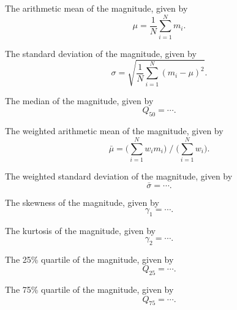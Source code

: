\begin{enumerate}

 The arithmetic mean of the magnitude, given by
\begin{equation}\mu = \frac{1}{N} \sum\limits_{i=1}^{N} m_i.\end{equation}

 The standard deviation of the magnitude, given by
\begin{equation}\sigma = \sqrt{\frac{1}{N} \sum_{i=1}^N (m_i - \mu)^2}.\end{equation}

 The median of the magnitude, given by
\begin{equation}Q_{50} = \cdots.\end{equation}

 The weighted arithmetic mean of the magnitude, given by
\begin{equation}\bar \mu = \big(\sum\limits_{i=1}^{N} w_i m_i\big) \; / \; \big(\sum\limits_{i=1}^{N} w_i\big).\end{equation}

 The weighted standard deviation of the magnitude, given by
\begin{equation}\bar \sigma = \cdots.\end{equation}

 The skewness of the magnitude, given by
\begin{equation}\gamma_1 = \cdots.\end{equation}

 The kurtosis of the magnitude, given by
\begin{equation}\gamma_2 = \cdots.\end{equation}

 The 25\% quartile of the magnitude, given by
\begin{equation}Q_{25} = \cdots.\end{equation}

 The 75\% quartile of the magnitude, given by
\begin{equation}Q_{75} = \cdots.\end{equation}


\end{enumerate}
